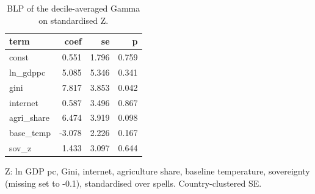 \begin{table}[htbp]
\centering
\caption{BLP of the decile-averaged Gamma on standardised Z.}
\label{tab:blp}
\begin{tabular}{lrrr}
\toprule
term & coef & se & p \\
\midrule
const & 0.551 & 1.796 & 0.759 \\
ln\_gdppc & 5.085 & 5.346 & 0.341 \\
gini & 7.817 & 3.853 & 0.042 \\
internet & 0.587 & 3.496 & 0.867 \\
agri\_share & 6.474 & 3.919 & 0.098 \\
base\_temp & -3.078 & 2.226 & 0.167 \\
sov\_z & 1.433 & 3.097 & 0.644 \\
\bottomrule
\end{tabular}
\par\smallskip\footnotesize Z: ln GDP pc, Gini, internet, agriculture share, baseline temperature, sovereignty (missing set to -0.1), standardised over spells. Country-clustered SE.
\end{table}
